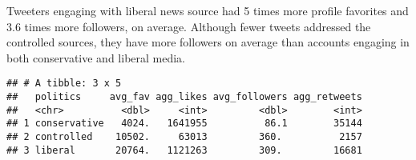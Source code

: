 \documentclass[
]{article}
\newenvironment{Shaded}{\begin{snugshade}}{\end{snugshade}}
\newcommand{\AttributeTok}[1]{\textcolor[rgb]{0.77,0.63,0.00}{#1}}
\newcommand{\CommentTok}[1]{\textcolor[rgb]{0.56,0.35,0.01}{\textit{#1}}}
\newcommand{\FunctionTok}[1]{\textcolor[rgb]{0.00,0.00,0.00}{#1}}
\newcommand{\NormalTok}[1]{#1}
\newcommand{\OtherTok}[1]{\textcolor[rgb]{0.56,0.35,0.01}{#1}}
\newcommand{\SpecialCharTok}[1]{\textcolor[rgb]{0.00,0.00,0.00}{#1}}
\newcommand{\StringTok}[1]{\textcolor[rgb]{0.31,0.60,0.02}{#1}}
\begin{document}
Tweeters engaging with liberal news source had 5 times more profile
favorites and 3.6 times more followers, on average. Although fewer
tweets addressed the controlled sources, they have more followers on
average than accounts engaging in both conservative and liberal media.

\begin{Shaded}
\end{Shaded}

\begin{verbatim}
## # A tibble: 3 x 5
##   politics     avg_fav agg_likes avg_followers agg_retweets
##   <chr>          <dbl>     <int>         <dbl>        <int>
## 1 conservative   4024.   1641955          86.1        35144
## 2 controlled    10502.     63013         360.          2157
## 3 liberal       20764.   1121263         309.         16681
\end{verbatim}
\end{document}
